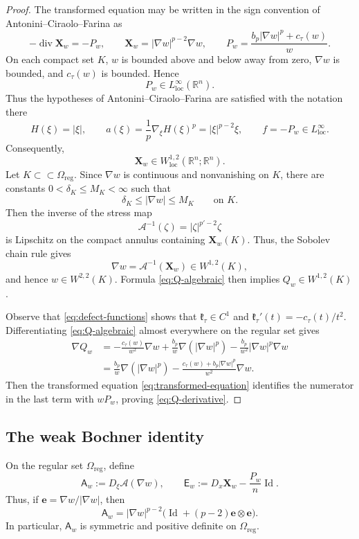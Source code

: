 \documentclass[reqno,12pt]{amsart}
\numberwithin{equation}{section}
\theoremstyle{remark}
\newcommand{\R}{\mathbb R}
\newcommand{\loc}{\mathrm{loc}}
\newcommand{\Id}{\operatorname{Id}}
\newcommand{\Acal}{\mathcal A}
\newcommand{\Xbf}{\mathbf X}
\begin{document}
\begin{proof}
The transformed equation may be written in the sign convention of Antonini--Ciraolo--Farina \cite{ACF2023} as
$$
-\operatorname{div}\Xbf_w = -P_w,
\qquad \Xbf_w = |\nabla w|^{p-2}\nabla w,
\qquad P_w = \frac{b_p|\nabla w|^p+c_\tau(w)}{w}.
$$
On each compact set $K$, $w$ is bounded above and below away from zero, $\nabla w$ is bounded, and $c_\tau(w)$ is bounded.  Hence
$$
P_w\in L^\infty_{\loc}(\R^n).
$$
Thus the hypotheses of Antonini--Ciraolo--Farina
\cite[Theorem~1.1]{ACF2023} are satisfied with the notation there
$$
H(\xi)=|\xi|, \qquad 
a(\xi)=\frac 1 p \nabla_\xi H(\xi)^p =|\xi|^{p-2}\xi,
\qquad f=-P_w\in L^\infty_{\loc}.
$$
Consequently,
$$
    \Xbf_w\in W^{1,2}_{\loc}(\R^n;\R^n).
$$
Let $K\subset\subset\Omega_{\mathrm{reg}}$.  Since
$\nabla w$ is continuous and nonvanishing on $K$, there are
constants $0<\delta_K\le M_K<\infty$ such that
$$
    \delta_K\le|\nabla w|\le M_K \qquad\text{on }K.
$$
Then the inverse of the stress map
$$
    \Acal^{-1}(\zeta)=|\zeta|^{p'-2}\zeta
$$
is Lipschitz on the compact annulus containing
$\Xbf_w(K)$.  Thus, the Sobolev chain rule  gives
$$
    \nabla w=\Acal^{-1}(\Xbf_w)\in W^{1,2}(K),
$$
and hence $w\in W^{2,2}(K)$.  Formula \eqref{eq:Q-algebraic} then implies $Q_w\in W^{1,2}(K)$.

Observe that \eqref{eq:defect-functions} shows that
$\mathfrak k_\tau\in C^1$ and
$\mathfrak k_\tau'(t)=-c_\tau(t)/t^2$.  Differentiating
\eqref{eq:Q-algebraic} almost everywhere on the regular set gives
\begin{align*}
 \nabla Q_w &= -\frac{c_\tau(w)}{w^2}\nabla w + \frac{b_p}{w}\nabla(|\nabla w|^p) -  \frac{b_p}{w^2} |\nabla w|^p \nabla w \\
 & = \frac{b_p}{w}\nabla(|\nabla w|^p)
  -\frac{c_\tau(w)+b_p|\nabla w|^p}{w^2}\nabla w.    
\end{align*}
Then the transformed equation \eqref{eq:transformed-equation} identifies the numerator in the last term with $wP_w$, proving \eqref{eq:Q-derivative}.
\end{proof}

\subsection{The weak Bochner identity}

On the regular set $\Omega_{\mathrm{reg}}$, define
\begin{equation}\label{eq:defn-Ew}
\mathsf A_w :=D_\xi\Acal(\nabla w),
\qquad \mathsf E_w:=D_x\Xbf_w-\frac{P_w}{n}\Id.
\end{equation}
Thus, if $\mathbf e=\nabla w/|\nabla w|$, then
$$
\mathsf A_w =|\nabla w|^{p-2}
\bigl(\Id+(p-2)\mathbf e\otimes\mathbf e\bigr).
$$
In particular, $\mathsf A_w$ is symmetric and positive definite on
$\Omega_{\mathrm{reg}}$.
\end{document}
